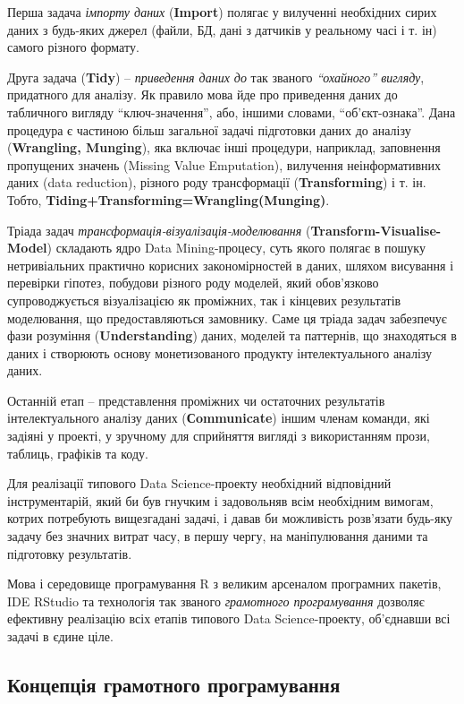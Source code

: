 \documentclass[
]{book}
\begin{document}
Перша задача \emph{імпорту даних} (\textbf{Import}) полягає у вилученні необхідних сирих даних з будь-яких джерел (файли, БД, дані з датчиків у реальному часі і т. ін) самого різного формату.

Друга задача (\textbf{Tidy}) -- \emph{приведення даних до} так званого \emph{``охайного'' вигляду}, придатного для аналізу. Як правило мова йде про приведення даних до табличного вигляду ``ключ-значення'', або, іншими словами, ``об'єкт-ознака''. Дана процедура є частиною більш загальної задачі підготовки даних до аналізу (\textbf{Wrangling, Munging}), яка включає інші процедури, наприклад, заповнення пропущених значень (Missing Value Emputation), вилучення неінформативних даних (data reduction), різного роду трансформації (\textbf{Transforming}) і т. ін. Тобто, \textbf{Tiding+Transforming=Wrangling(Munging)}.

Тріада задач \emph{трансформація-візуалізація-моделювання} (\textbf{Transform-Visualise-Model}) складають ядро Data Mining-процесу, суть якого полягає в пошуку нетривіальних практично корисних закономірностей в даних, шляхом висування і перевірки гіпотез, побудови різного роду моделей, який обов'язково супроводжується візуалізацією як проміжних, так і кінцевих результатів моделювання, що предоставляються замовнику. Саме ця тріада задач забезпечує фази розуміння (\textbf{Understanding}) даних, моделей та паттернів, що знаходяться в даних і створюють основу монетизованого продукту інтелектуального аналізу даних.

Останній етап -- представлення проміжних чи остаточних результатів інтелектуального аналізу даних (\textbf{Сommunicate}) іншим членам команди, які задіяні у проекті, у зручному для сприйняття вигляді з використанням прози, таблиць, графіків та коду.

Для реалізації типового Data Science-проекту необхідний відповідний інструментарій, який би був гнучким і задовольняв всім необхідним вимогам, котрих потребують вищезгадані задачі, і давав би можливість розв'язати будь-яку задачу без значних витрат часу, в першу чергу, на маніпулювання даними та підготовку результатів.

Мова і середовище програмування R з великим арсеналом програмних пакетів, IDE RStudio та технологія так званого \emph{грамотного програмування} дозволяє ефективну реалізацію всіх етапів типового Data Science-проекту, об'єднавши всі задачі в єдине ціле.

\hypertarget{ux43aux43eux43dux446ux435ux43fux446ux456ux44f-ux433ux440ux430ux43cux43eux442ux43dux43eux433ux43e-ux43fux440ux43eux433ux440ux430ux43cux443ux432ux430ux43dux43dux44f}{%
\subsection{Концепція грамотного програмування}\label{ux43aux43eux43dux446ux435ux43fux446ux456ux44f-ux433ux440ux430ux43cux43eux442ux43dux43eux433ux43e-ux43fux440ux43eux433ux440ux430ux43cux443ux432ux430ux43dux43dux44f}}
\end{document}
